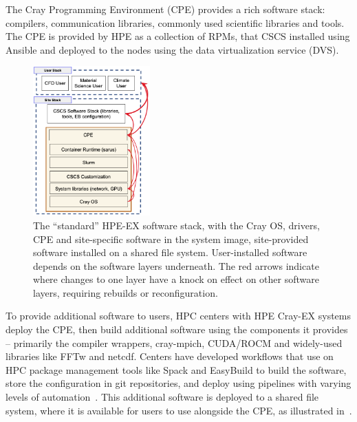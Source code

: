 The Cray Programming Environment (CPE) provides a rich software stack: compilers, communication libraries, commonly used scientific libraries and tools.
The CPE is provided by HPE as a collection of RPMs, that CSCS installed using Ansible and deployed to the nodes using the data virtualization service (DVS)\cite{dvs}.

\begin{figure}[htp!]
    \begin{center}
        \includegraphics[width=0.4\textwidth]{./images/stack-old.png}
    \end{center}
    \caption{
        The ``standard'' HPE-EX software stack, with the Cray OS, drivers, CPE and site-specific software in the system image, site-provided software installed on a shared file system.
        User-installed software depends on the software layers underneath.
        The red arrows indicate where changes to one layer have a knock on effect on other software layers, requiring rebuilds or reconfiguration.
    }
    \label{fig:cpe-stack}
\end{figure}

To provide additional software to users, HPC centers with HPE Cray-EX systems deploy the CPE, then build additional software using the components it provides -- primarily the compiler wrappers, cray-mpich, CUDA/ROCM and widely-used libraries like FFTw and netcdf.
Centers have developed workflows that use on HPC package management tools like Spack and EasyBuild to build the software, store the configuration in git repositories, and deploy using pipelines with varying levels of automation~\cite{setonix2023,eb2016}.
This additional software is deployed to a shared file system, where it is available for users to use alongside the CPE, as illustrated in~.


